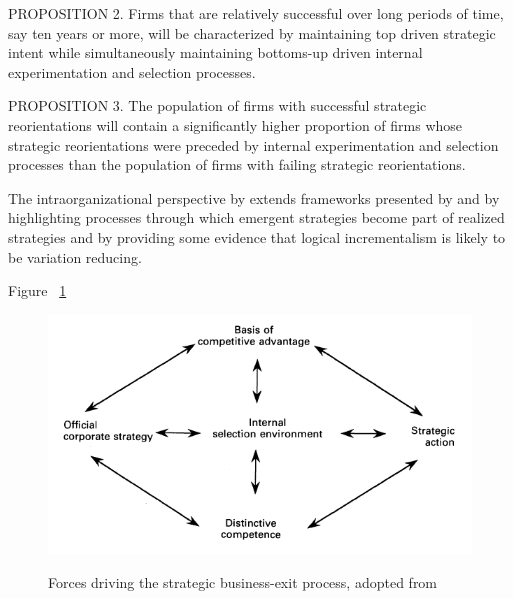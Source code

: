 \documentclass[12pt,letterpaper]{article}
\begin{document}
PROPOSITION 2. Firms that are relatively successful over long periods of time, say ten years or more, will be characterized by maintaining top driven strategic intent while simultaneously maintaining bottoms-up driven internal experimentation and selection processes.

PROPOSITION 3. The population of firms with successful strategic reorientations will contain a significantly higher proportion of firms whose strategic reorientations were preceded by internal experimentation and selection processes than the population of firms with failing strategic reorientations.

The intraorganizational perspective by \cite{Burgelman1991} extends frameworks presented by \cite{Mintzberg1978} and \cite{Quinn1980} by highlighting  processes through which emergent strategies become part of realized strategies and by providing some evidence that logical incrementalism is likely to be variation reducing. 



Figure ~\ref{fig:Burgelman1994}

\begin{figure}[h]
\begin{centering}
  \caption{Forces driving the strategic business-exit process, adopted from \cite{Burgelman1994}}
  \includegraphics[width=\textwidth]{Burgelman1994}
  \label{fig:Burgelman1994}
\end{centering}
\end{figure}
\end{document}

